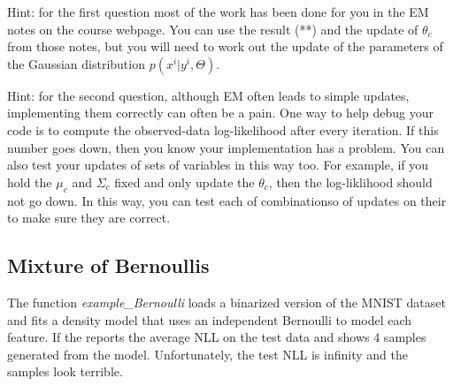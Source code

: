 \documentclass{article}
\begin{document}
Hint: for the first question most of the work has been done for you in the EM notes on the course webpage. You can use the result (**) and the update of $\theta_c$ from those notes, but you will need to work out the update of the parameters of the Gaussian distribution $p(x^i | y^i, \Theta)$.

Hint: for the second question, although EM often leads to simple updates, implementing them correctly can often be a pain. One way to help debug your code is to compute the observed-data log-likelihood after every iteration. If this number goes down, then you know your implementation has a problem. You can also test your updates of sets of variables in this way too. For example, if you hold the $\mu_c$ and $\Sigma_c$ fixed and only update the $\theta_c$, then the log-liklihood should not go down. In this way, you can test each of combinationso of updates on their to make sure they are correct.



\subsection{Mixture of Bernoullis}

The function \emph{example\_Bernoulli} loads a binarized version of the MNIST dataset and fits a density model that uses an independent Bernoulli to model each feature. If the reports the average NLL on the test data and shows 4 samples generated from the model. Unfortunately, the test NLL is infinity and the samples look terrible.
\end{document}
